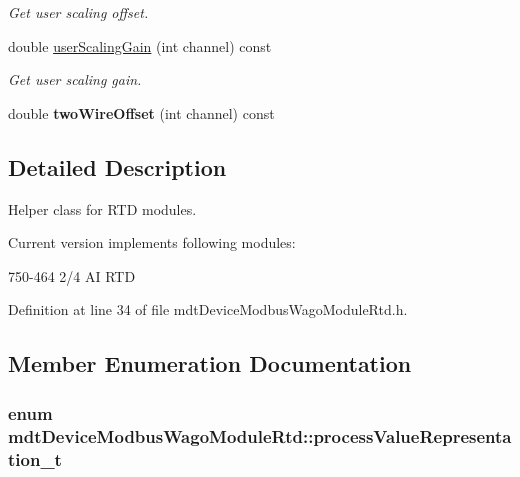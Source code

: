 \begin{DoxyCompactItemize}
\begin{DoxyCompactList}\small\item\em Get user scaling offset. \end{DoxyCompactList}\item 
\hypertarget{classmdt_device_modbus_wago_module_rtd_a5bf6697432dc475533db1e36889a6ad4}{
double \hyperlink{classmdt_device_modbus_wago_module_rtd_a5bf6697432dc475533db1e36889a6ad4}{userScalingGain} (int channel) const }
\label{classmdt_device_modbus_wago_module_rtd_a5bf6697432dc475533db1e36889a6ad4}

\begin{DoxyCompactList}\small\item\em Get user scaling gain. \end{DoxyCompactList}\item 
\hypertarget{classmdt_device_modbus_wago_module_rtd_a110c774e640f45309e1f14a8b65a7b0e}{
double {\bfseries twoWireOffset} (int channel) const }
\label{classmdt_device_modbus_wago_module_rtd_a110c774e640f45309e1f14a8b65a7b0e}

\end{DoxyCompactItemize}


\subsection{Detailed Description}
Helper class for RTD modules. 

Current version implements following modules:
\begin{DoxyItemize}
\item 750-\/464 2/4 AI RTD 
\end{DoxyItemize}

Definition at line 34 of file mdtDeviceModbusWagoModuleRtd.h.



\subsection{Member Enumeration Documentation}
\hypertarget{classmdt_device_modbus_wago_module_rtd_a6edcc72b85641ca88d66ca45a7650ca8}{
\subsubsection[{processValueRepresentation\_\-t}]{\setlength{\rightskip}{0pt plus 5cm}enum {\bf mdtDeviceModbusWagoModuleRtd::processValueRepresentation\_\-t}}}
\label{classmdt_device_modbus_wago_module_rtd_a6edcc72b85641ca88d66ca45a7650ca8}


